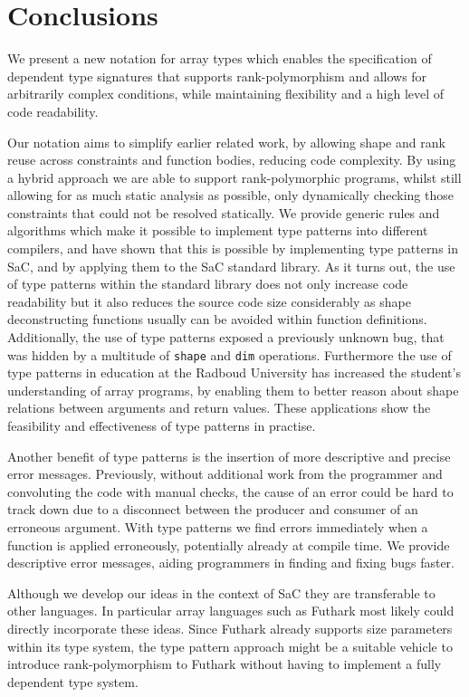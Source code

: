 \section{Conclusions}

We present a new notation for array types which enables the specification of dependent type signatures that supports rank-polymorphism and allows for arbitrarily complex conditions, while maintaining flexibility and a high level of code readability.

Our notation aims to simplify earlier related work, by allowing shape and rank reuse across constraints and function bodies, reducing code complexity.
By using a hybrid approach we are able to support rank-polymorphic programs, whilst still allowing for as much static analysis as possible, only dynamically checking those constraints that could not be resolved statically.
We provide generic rules and algorithms which make it possible to implement type patterns into different compilers, and have shown that this is possible by implementing type patterns in SaC, and by applying them to the SaC standard library.
As it turns out, the use of type patterns within the standard library does not only increase code readability but it also reduces the source code size considerably as shape deconstructing functions usually can be avoided within function definitions.
Additionally, the use of type patterns exposed a previously unknown bug, that was hidden by a multitude of \texttt{shape} and \texttt{dim} operations.
Furthermore the use of type patterns in education at the Radboud University has increased the student's understanding of array programs, by enabling them to better reason about shape relations between arguments and return values.
These applications show the feasibility and effectiveness of type patterns in practise.

Another benefit of type patterns is the insertion of more descriptive and precise error messages.
Previously, without additional work from the programmer and convoluting the code with manual checks, the cause of an error could be hard to track down due to a disconnect between the producer and consumer of an erroneous argument.
With type patterns we find errors immediately when a function is applied erroneously, potentially already at compile time.
We provide descriptive error messages, aiding programmers in finding and fixing bugs faster.

Although we develop our ideas in the context of SaC they are transferable
to other languages. In particular array languages such as Futhark most likely could directly incorporate these ideas.
Since Futhark already supports size parameters within its type system, the type pattern approach might be a suitable vehicle to introduce rank-polymorphism to Futhark without having to implement a fully dependent type system.


